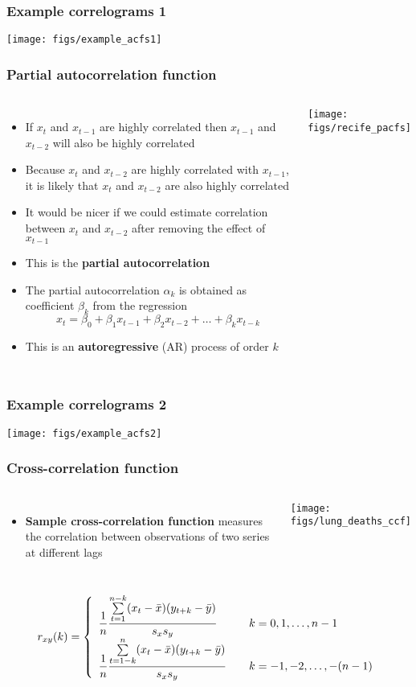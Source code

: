 \documentclass{beamer}
\begin{document}
\begin{frame}
\frametitle{Example correlograms 1}
\begin{center}
    \texttt{[image: figs/example\_acfs1]}
\end{center}
\end{frame}

\begin{frame}
\frametitle{Partial autocorrelation function}
\small
\begin{columns}
    \column{7cm}
    \begin{itemize}
        \item If $x_t$ and $x_{t-1}$ are highly correlated then $x_{t-1}$ and $x_{t-2}$ will also be highly correlated
        \item Because $x_t$ and $x_{t-2}$ are highly correlated with $x_{t-1}$, it is likely that $x_t$ and $x_{t-2}$ are also highly correlated
        \item It would be nicer if we could estimate correlation between $x_t$ and $x_{t-2}$ after removing the effect of $x_{t-1}$
        \item This is the \textbf{partial autocorrelation}
        \item The partial autocorrelation $\alpha_k$ is obtained as coefficient $\beta_k$ from the regression
        $$x_t = \beta_0 + \beta_1x_{t-1} + \beta_2x_{t-2} + \dots + \beta_kx_{t-k}$$
        \item This is an \textbf{autoregressive} (AR) process of order $k$
    \end{itemize}
    \column{5cm}
    \texttt{[image: figs/recife\_pacfs]}
\end{columns}
\normalsize
\end{frame}

\begin{frame}
\frametitle{Example correlograms 2}
\begin{center}
    \texttt{[image: figs/example\_acfs2]}
\end{center}
\end{frame}

\begin{frame}
\frametitle{Cross-correlation function}
\small
\begin{columns}
    \column{7cm}
    \begin{itemize}
        \item \textbf{Sample cross-correlation function} measures the correlation between observations of two series at different lags
    \end{itemize}
    \column{5cm}
    \texttt{[image: figs/lung\_deaths\_ccf]}
\end{columns}
$$r_{xy}(k) = \left\{ \begin{array}{l@{\qquad}l}
    \displaystyle{\frac{1}{n}\frac{\sum \limits^{n-k}_{t=1}(x_t-\bar{x})(y_{t+k} - \bar{y})}{s_xs_y}} & k = 0,1,\ldots,n-1 \\
    \displaystyle{\frac{1}{n}\frac{\sum \limits^{n}_{t=1-k}(x_t-\bar{x})(y_{t+k} - \bar{y})}{s_xs_y}} & k = -1,-2,\ldots,-(n-1) \\
    \end{array} \right.$$
\normalsize
\end{frame}
\end{document}
